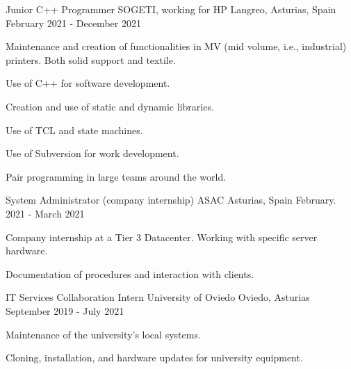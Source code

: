 \begin{cventries}
\cventry
{Junior C++ Programmer} %
{SOGETI, working for HP} %
{Langreo, Asturias, Spain} %
{February 2021 - December 2021} %
{
    \begin{cvitems} %
        \item {Maintenance and creation of functionalities in MV (mid volume, i.e., industrial) printers.
                    Both solid support and textile.}
        \item {Use of C++ for software development.}
        \item {Creation and use of static and dynamic libraries.}
        \item {Use of TCL and state machines.}
        \item {Use of Subversion for work development.}
        \item {Pair programming in large teams around the world.}
    \end{cvitems}
}

\cventry
{System Administrator (company internship)} %
{ASAC} %
{Asturias, Spain} %
{February. 2021 - March 2021} %
{
    \begin{cvitems} %
        \item {Company internship at a Tier 3 Datacenter. Working with specific server hardware.}
        \item {Documentation of procedures and interaction with clients.}
    \end{cvitems}
}



\cventry
{IT Services Collaboration Intern} %
{University of Oviedo} %
{Oviedo, Asturias} %
{September 2019 - July 2021} %
{
    \begin{cvitems} %
        \item {Maintenance of the university's local systems.}
        \item {Cloning, installation, and hardware updates for university equipment.}
    \end{cvitems}
}


\end{cventries}

